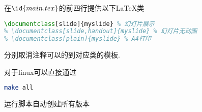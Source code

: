在$\id{main.tex}$的前四行提供以下\LaTeX 类

\begin{lstlisting}[language=tex]
% \documentclass[ebook]{myslide} % 移动设备
\documentclass[slide]{myslide} % 幻灯片展示
% \documentclass[slide,handout]{myslide} % 幻灯片无动画
% \documentclass[plain]{myslide} % A4打印
\end{lstlisting}
分别取消注释可以的到对应类的模板.

对于linux可以直接通过
\begin{lstlisting}[language=bash]
make all
\end{lstlisting}
运行脚本自动创建所有版本
